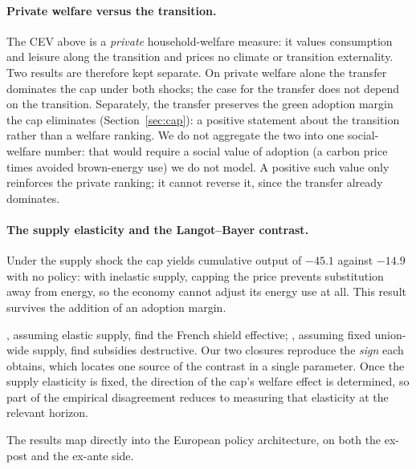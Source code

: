 \paragraph{Private welfare versus the transition.} The CEV above is a
\emph{private} household-welfare measure: it values consumption and leisure along
the transition and prices no climate or transition externality. Two results are
therefore kept separate. On private welfare alone the transfer dominates the cap
under both shocks; the case for the transfer does not depend on the transition.
Separately, the transfer preserves the green adoption margin the cap eliminates
(Section~\ref{sec:cap}): a positive statement about the transition rather than a
welfare ranking. We do not aggregate the two into one social-welfare number: that would
require a social value of adoption (a carbon price times avoided brown-energy use)
we do not model. A positive such value only reinforces the private ranking; it
cannot reverse it, since the transfer already dominates.

\paragraph{The supply elasticity and the Langot--Bayer contrast.}\label{sec:supply_elasticity} Under the supply shock the cap yields cumulative output of $-45.1$ against
$-14.9$ with no policy: with inelastic supply, capping the price prevents
substitution away from energy, so the economy cannot adjust its energy use at all.
This result survives the addition of an adoption margin.

\citet{langot2026tariff},
assuming elastic supply, find the French shield effective; \citet{bayer2026hank},
assuming fixed union-wide supply, find subsidies destructive. Our two closures
reproduce the \emph{sign} each obtains, which locates one source of the contrast
in a single parameter. Once the supply elasticity is fixed, the direction of the
cap's welfare effect is determined, so part of the empirical disagreement reduces
to measuring that elasticity at the relevant horizon.

The results map directly into the European policy architecture, on both the
ex-post and the ex-ante side.

